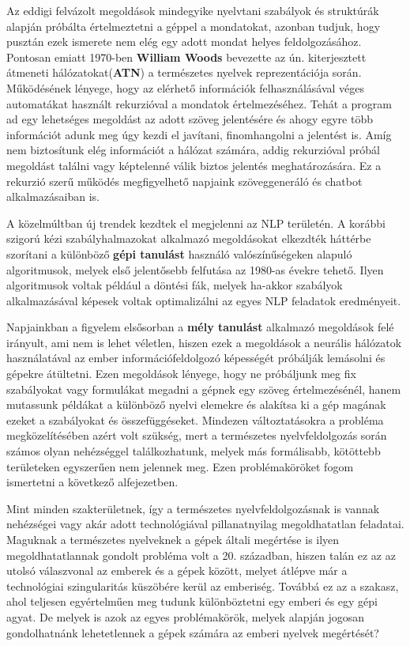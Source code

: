 Az eddigi felvázolt megoldások mindegyike nyelvtani szabályok és struktúrák alapján próbálta értelmeztetni a géppel a mondatokat, azonban tudjuk, hogy pusztán ezek ismerete nem elég egy adott mondat helyes feldolgozásához. Pontosan emiatt 1970-ben \textbf{William Woods} bevezette az ún. kiterjesztett átmeneti hálózatokat(\textbf{ATN}) a természetes nyelvek reprezentációja során. Működésének lényege, hogy az elérhető információk felhasználásával véges automatákat használt rekurzióval a mondatok értelmezéséhez. Tehát a program ad egy lehetséges megoldást az adott szöveg jelentésére és ahogy egyre több információt adunk meg úgy kezdi el javítani, finomhangolni a jelentést is. Amíg nem biztosítunk elég információt a hálózat számára, addig rekurzióval próbál megoldást találni vagy képtelenné válik biztos jelentés meghatározására. Ez a rekurzió szerű működés megfigyelhető napjaink szöveggeneráló és chatbot alkalmazásaiban is.

A közelmúltban új trendek kezdtek el megjelenni az NLP területén. A korábbi szigorú kézi szabályhalmazokat alkalmazó megoldásokat elkezdték háttérbe szorítani a különböző \textbf{gépi tanulást} használó valószínűségeken alapuló algoritmusok, melyek első jelentősebb felfutása az 1980-as évekre tehető. Ilyen algoritmusok voltak például a döntési fák, melyek ha-akkor szabályok alkalmazásával képesek voltak optimalizálni az egyes NLP feladatok eredményeit.

Napjainkban a figyelem elsősorban a \textbf{mély tanulást} alkalmazó megoldások felé irányult, ami nem is lehet véletlen, hiszen ezek a megoldások a neurális hálózatok használatával az ember információfeldolgozó képességét próbálják lemásolni és gépekre átültetni. Ezen megoldások lényege, hogy ne próbáljunk meg fix szabályokat vagy formulákat megadni a gépnek egy szöveg értelmezésénél, hanem mutassunk példákat a különböző nyelvi elemekre és alakítsa ki a gép magának ezeket a szabályokat és összefüggéseket. Mindezen változtatásokra a probléma megközelítésében azért volt szükség, mert a természetes nyelvfeldolgozás során számos olyan nehézséggel találkozhatunk, melyek más formálisabb, kötöttebb területeken egyszerűen nem jelennek meg. Ezen problémaköröket fogom ismertetni a következő alfejezetben.


Mint minden szakterületnek, így a természetes nyelvfeldolgozásnak is vannak nehézségei vagy akár adott technológiával pillanatnyilag megoldhatatlan feladatai. Maguknak a természetes nyelveknek a gépek általi megértése is ilyen megoldhatatlannak gondolt probléma volt a 20. században, hiszen talán ez az az utolsó válaszvonal az emberek és a gépek között, melyet átlépve már a technológiai szingularitás küszöbére kerül az emberiség. Továbbá ez az a szakasz, ahol teljesen egyértelműen meg tudunk különböztetni egy emberi és egy gépi agyat. De melyek is azok az egyes problémakörök, melyek alapján jogosan gondolhatnánk lehetetlennek a gépek számára az emberi nyelvek megértését?

